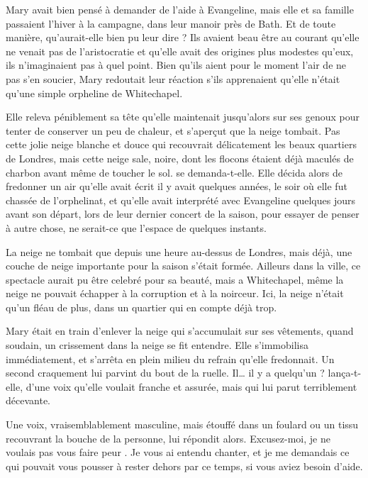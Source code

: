 Mary avait bien pensé à demander de l'aide à Evangeline, mais elle et sa famille passaient l'hiver à la campagne, dans leur manoir près de Bath.
Et de toute manière, qu'aurait-elle bien pu leur dire ?
Ils avaient beau être au courant qu'elle ne venait pas de l'aristocratie et qu'elle avait des origines plus modestes qu'eux, ils n'imaginaient pas à quel point.
Bien qu'ils aient pour le moment l'air de ne pas s'en soucier, Mary redoutait leur réaction s'ils apprenaient qu'elle n'était qu'une simple orpheline de Whitechapel.

Elle releva péniblement sa tête qu'elle maintenait jusqu'alors sur ses genoux pour tenter de conserver un peu de chaleur, et s'aperçut que la neige tombait.
Pas cette jolie neige blanche et douce qui recouvrait délicatement les beaux quartiers de Londres, mais cette neige sale, noire, dont les flocons étaient déjà maculés de charbon avant même de toucher le sol.
 se demanda-t-elle.
Elle décida alors de fredonner un air qu'elle avait écrit il y avait quelques années, le soir où elle fut chassée de l'orphelinat, et qu'elle avait interprété avec Evangeline quelques jours avant son départ, lors de leur dernier concert de la saison, pour essayer de penser à autre chose, ne serait-ce que l'espace de quelques instants.

\separation

La neige ne tombait que depuis une heure au-dessus de Londres, mais déjà, une couche de neige importante pour la saison s'était formée.
Ailleurs dans la ville, ce spectacle aurait pu être celebré pour sa beauté, mais a Whitechapel, même la neige ne pouvait échapper à la corruption et à la noirceur.
Ici, la neige n'était qu'un fléau de plus, dans un quartier qui en compte déjà trop.

Mary était en train d'enlever la neige qui s'accumulait sur ses vêtements, quand soudain, un crissement dans la neige se fit entendre.
Elle s'immobilisa immédiatement, et s'arrêta en plein milieu du refrain qu'elle fredonnait.
Un second craquement lui parvint du bout de la ruelle.
\rep Il\ldots{} il y a quelqu'un ?
lança-t-elle, d'une voix qu'elle voulait franche et assurée, mais qui lui parut terriblement décevante.

Une voix, vraisemblablement masculine, mais étouffé dans un foulard ou un tissu recouvrant la bouche de la personne, lui répondit alors.
\rep Excusez-moi, je ne voulais pas vous faire peur .
Je vous ai entendu chanter, et je me demandais ce qui pouvait vous pousser à rester dehors par ce temps, si vous aviez besoin d'aide.

